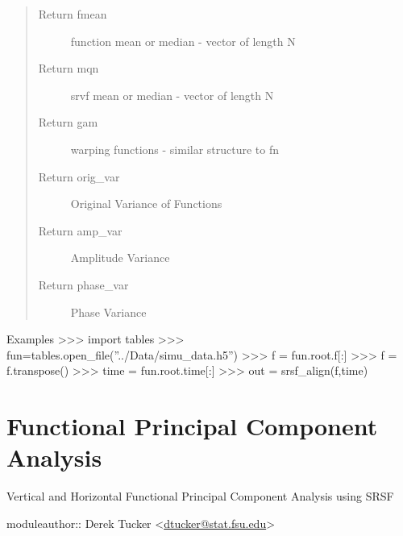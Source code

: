\documentclass[letterpaper,10pt,english]{sphinxmanual}
\begin{document}
\begin{fulllineitems}
\begin{quote}
\begin{description}
\item[{Return fmean}] \leavevmode
function mean or median - vector of length N

\item[{Return mqn}] \leavevmode
srvf mean or median - vector of length N

\item[{Return gam}] \leavevmode
warping functions - similar structure to fn

\item[{Return orig\_var}] \leavevmode
Original Variance of Functions

\item[{Return amp\_var}] \leavevmode
Amplitude Variance

\item[{Return phase\_var}] \leavevmode
Phase Variance

\end{description}\end{quote}

Examples
\textgreater{}\textgreater{}\textgreater{} import tables
\textgreater{}\textgreater{}\textgreater{} fun=tables.open\_file(''../Data/simu\_data.h5'')
\textgreater{}\textgreater{}\textgreater{} f = fun.root.f{[}:{]}
\textgreater{}\textgreater{}\textgreater{} f = f.transpose()
\textgreater{}\textgreater{}\textgreater{} time = fun.root.time{[}:{]}
\textgreater{}\textgreater{}\textgreater{} out = srsf\_align(f,time)

\end{fulllineitems}



\chapter{Functional Principal Component Analysis}
\label{fPCA:module-fPCA}\label{fPCA::doc}\label{fPCA:functional-principal-component-analysis}
Vertical and Horizontal Functional Principal Component Analysis using SRSF

moduleauthor:: Derek Tucker \textless{}\href{mailto:dtucker@stat.fsu.edu}{dtucker@stat.fsu.edu}\textgreater{}
\end{document}
